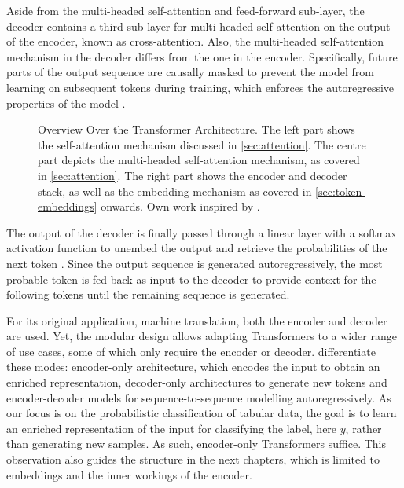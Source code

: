 Aside from the multi-headed self-attention and feed-forward sub-layer, the decoder contains a third sub-layer for multi-headed self-attention on the output of the encoder, known as cross-attention. Also, the multi-headed self-attention mechanism in the decoder differs from the one in the encoder. Specifically, future parts of the output sequence are causally masked to prevent the model from learning on subsequent \glspl{token} during training, which enforces the autoregressive properties of the model \autocites[][3]{vaswaniAttentionAllYou2017}[][15]{narangTransformerModificationsTransfer2021}.

\begin{landscape}
  \begin{figure}[h]
    \begin{center}
      {\renewcommand\normalsize{\scriptsize\sf}%
      \normalsize
      }
    \end{center}
    \caption[Overview Over the Transformer Architecture]{Overview Over the Transformer Architecture. The left part shows the self-attention mechanism discussed in \cref{sec:attention}. The centre part depicts the multi-headed self-attention mechanism, as covered in \cref{sec:attention}. The right part shows the encoder and decoder stack, as well as the \gls{embedding} mechanism as covered in \cref{sec:token-embeddings} onwards. Own work inspired by \textcite[][3]{tayEfficientTransformersSurvey2022}.}
    \label{fig:transformer-architecture-overview}
  \end{figure}
\end{landscape}
The output of the decoder is finally passed through a linear layer with a softmax activation function to unembed the output and retrieve the probabilities of the next \gls{token} \autocite[][5]{vaswaniAttentionAllYou2017}. Since the output sequence is generated autoregressively, the most probable \gls{token} is fed back as input to the decoder to provide context for the following \glspl{token} until the remaining sequence is generated.

For its original application, machine translation, both the encoder and decoder are used. Yet, the modular design allows adapting Transformers to a wider range of use cases, some of which only require the encoder or decoder. \textcite[][16--17]{raffelExploringLimitsTransfer2020} differentiate these modes: encoder-only architecture, which encodes the input to obtain an enriched representation, decoder-only architectures to generate new \glspl{token} and encoder-decoder models for sequence-to-sequence modelling autoregressively. As our focus is on the probabilistic classification of tabular data, the goal is to learn an enriched representation of the input for classifying the label, here $y$, rather than generating new samples. As such, encoder-only Transformers suffice. This observation also guides the structure in the next chapters, which is limited to \glspl{embedding} and the inner workings of the encoder.

